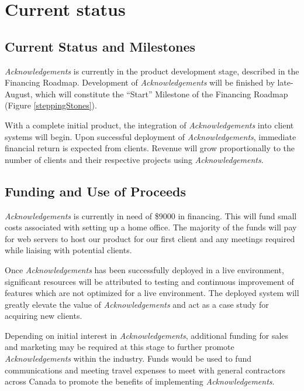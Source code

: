 \section{Current status}

\subsection{Current Status and Milestones}
{\it Acknowledgements} is currently in the product development stage, described in the Financing Roadmap. Development of {\it Acknowledgements} will be finished by late-August, which will constitute the ``Start'' Milestone of the Financing Roadmap (Figure \ref{steppingStones}). 

With a complete initial product, the integration of {\it Acknowledgements} into client systems will begin. Upon successful deployment of {\it Acknowledgements}, immediate financial return is expected from clients. Revenue will grow proportionally to the number of clients and their respective projects using {\it Acknowledgements}.

\subsection{Funding and Use of Proceeds}
{\it Acknowledgements} is currently in need of \$9000 in financing. This will fund small costs associated with setting up a home office. The majority of the funds will pay for web servers to host our product for our first client and any meetings required while liaising with potential clients.

Once {\it Acknowledgements} has been successfully deployed in a live environment, significant resources will be attributed to testing and continuous improvement of features which are not optimized for a live environment. The deployed system will greatly elevate the value of {\it Acknowledgements} and act as a case study for acquiring new clients. 

Depending on initial interest in {\it Acknowledgements}, additional funding for sales and marketing may be required at this stage to further promote {\it Acknowledgements} within the industry. Funds would be used to fund communications and meeting travel expenses to meet with general contractors across Canada to promote the benefits of implementing {\it Acknowledgements}.